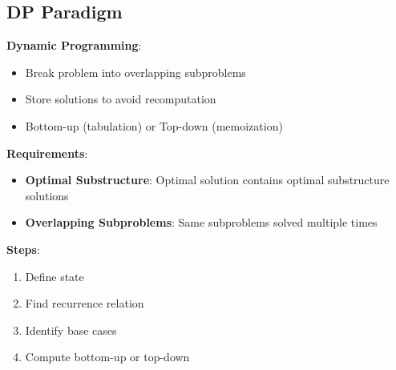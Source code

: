 \documentclass[12pt,a4paper]{report}
\begin{document}
\subsection{DP Paradigm}
\begin{concept}
\textbf{Dynamic Programming}:
\begin{itemize}
    \item Break problem into overlapping subproblems
    \item Store solutions to avoid recomputation
    \item Bottom-up (tabulation) or Top-down (memoization)
\end{itemize}

\textbf{Requirements}:
\begin{itemize}
    \item \textbf{Optimal Substructure}: Optimal solution contains optimal substructure solutions
    \item \textbf{Overlapping Subproblems}: Same subproblems solved multiple times
\end{itemize}

\textbf{Steps}:
\begin{enumerate}
    \item Define state
    \item Find recurrence relation
    \item Identify base cases
    \item Compute bottom-up or top-down
\end{enumerate}
\end{concept}
\end{document}
